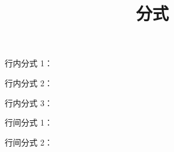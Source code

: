 \documentclass[a5paper,12pt]{ctexart}
\title{分式}
\author{} %
\date{} %
\begin{document}
\maketitle

行内分式 1： 
\vspace{1em}

行内分式 2： 
\vspace{1em}

行内分式 3： 
\vspace{1em}

行间分式 1： 

行间分式 2： 
\end{document}
